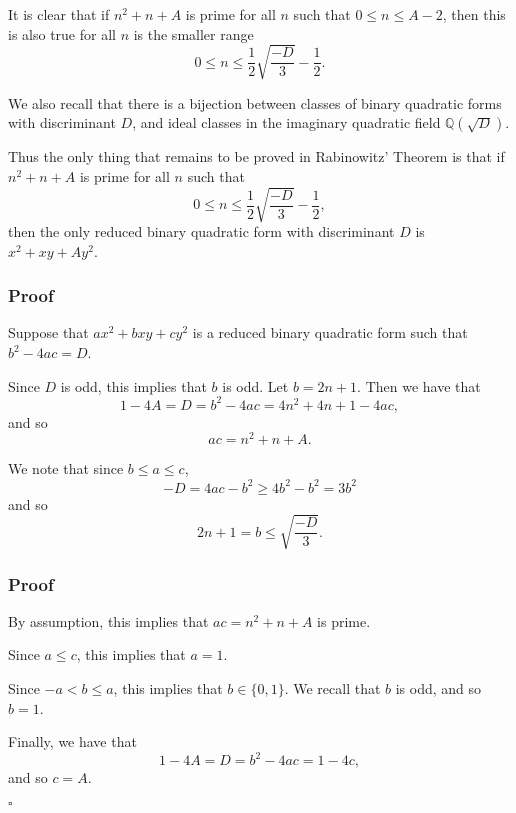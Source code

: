 \documentclass[handout]{beamer}
\begin{document}
\begin{frame}

	It is clear that if $n^2 + n + A$ is prime for all $n$ such that $0 \leq n \leq A - 2$, then this is also true for all $n$ is the smaller range
	\[
		0 \leq n \leq \frac{1}{2} \sqrt{\frac{-D}{3}} - \frac{1}{2}.
	\] \pause

	We also recall that there is a bijection between classes of binary quadratic forms with discriminant $D$, and ideal classes in the imaginary quadratic field $\mathbb{Q}(\sqrt{D})$. \pause

	Thus the only thing that remains to be proved in Rabinowitz' Theorem is that if $n^2 + n + A$ is prime for all $n$ such that
	\[
		0 \leq n \leq \frac{1}{2} \sqrt{\frac{-D}{3}} - \frac{1}{2},
	\]
	then the only reduced binary quadratic form with discriminant $D$ is $x^2 + xy + A y^2$.

\end{frame}

\begin{frame}

	\frametitle{Proof}

	Suppose that $ax^2 + bxy + cy^2$ is a reduced binary quadratic form such that $b^2 - 4ac = D$. \pause
	
	Since $D$ is odd, this implies that $b$ is odd. Let $b = 2n + 1$. Then we have that
	\[
		1 - 4A = D = b^2 - 4ac = 4n^2 + 4n + 1 - 4ac,
	\]
	and so
	\[
		ac = n^2 + n + A.
	\] \pause

	We note that since $b \leq a \leq c$,
	\[
		-D = 4ac - b^2 \geq 4b^2 - b^2 = 3b^2
	\]
	and so
	\[
		2n + 1 = b \leq \sqrt{\frac{-D}{3}}.
	\]

\end{frame}

\begin{frame}

	\frametitle{Proof}

	By assumption, this implies that $ac = n^2 + n + A$ is prime. \pause

	Since $a \leq c$, this implies that $a = 1$. \pause

	Since $-a < b \leq a$, this implies that $b \in \{0, 1\}$. We recall that $b$ is odd, and so $b = 1$. \pause

	Finally, we have that 
	\[
		1 - 4A = D = b^2 - 4ac = 1 - 4c,
	\]
	and so $c = A$.

	\hfill $\square$

\end{frame}
\end{document}
